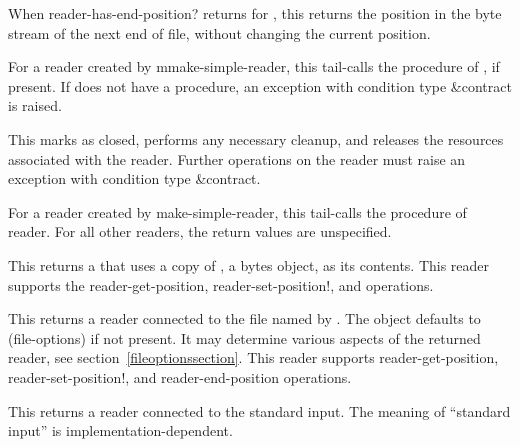 \begin{entry}{%
}
   
When {\cf reader-has-end-position?} returns \schtrue{} for ,
this returns the position in the byte stream of the next end of file,
without changing the current position.
   
For a reader created by {\cf mmake-simple-reader}, this tail-calls the
 procedure of , if present. If
 does not have a  procedure, an
exception with condition type {\cf\&contract} is raised.
\end{entry}

\begin{entry}{%
}
   
This marks  as closed, performs any necessary cleanup, and
releases the resources associated with the reader. Further operations
on the reader must raise an exception with condition type
{\cf\&contract}.
   
For a reader created by {\cf make-simple-reader}, this tail-calls the
 procedure of reader.  For all other readers, the return
values are unspecified.
\end{entry}

\begin{entry}{%
}

This returns a  that uses a copy of
, a bytes object, as its contents. This reader supports
the {\cf reader-get-position}, {\cf reader-set-position!}, and 
operations.
\end{entry}

\begin{entry}{%
}
   
This returns a reader connected to the file named by .
The  object defaults to {\cf (file-options)} if not
present. It may determine various aspects of the returned reader, see
section~\ref{fileoptionssection}. This reader supports {\cf reader-get-position},
{\cf reader-set-position!}, and {\cf reader-end-position} operations.
\end{entry} 

\begin{entry}{%
}
   
This returns a reader connected to the standard input. The meaning of
``standard input'' is implementation-dependent.
\end{entry}

